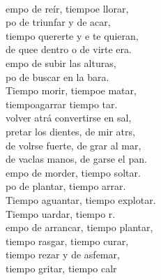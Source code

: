 \begin{cancion}%
	     \\
	empo de reír, tiempoe llorar,\\
	po de triunfar y de acar,\\
	tiempo  quererte y e te quieran,\\
	de quee dentro o de virte era.\\
	empo de subir las alturas,\\
	po de buscar en la bara.\\
	Tiempo  morir, tiempoe matar,\\
	tiempoagarrar tiempo  tar.\\
	 volver atrá convertirse en sal,\\
	pretar los dientes, de mir atrs,\\
	de volrse fuerte, de grar al mar,\\
	de vaclas manos, de garse el pan.\\
	empo de morder, tiempo  soltar.\\
	po de plantar, tiempo  arrar.\\
	Tiempo  aguantar, tiempo  explotar.\\
	Tiempo uardar, tiempo  r.\\
	empo de arrancar, tiempo  plantar,\\
	tiempo  rasgar, tiempo curar,\\
	tiempo  rezar y de asfemar,\\
	tiempo  gritar, tiempo  calr\\
	\begin{chorus}%

\end{chorus}
\end{cancion}
